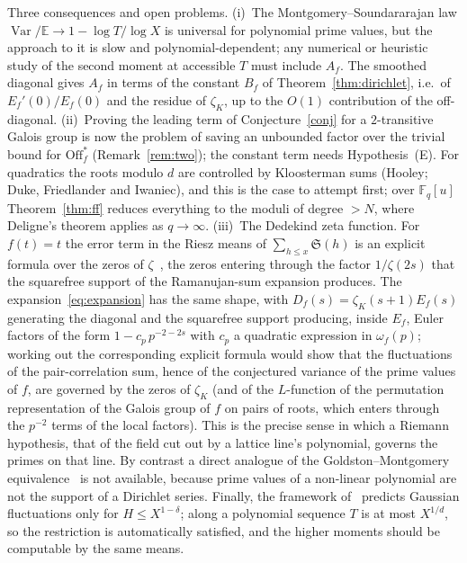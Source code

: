 \documentclass[11pt,a4paper]{article}
\theoremstyle{remark}\newtheorem{remark}[theorem]{Remark}
\newcommand{\F}{\mathbb{F}}
\newcommand{\Var}{\operatorname{Var}}
\newcommand{\E}{\mathbb{E}}
\newcommand{\Sig}{\mathfrak S}
\begin{document}
Three consequences and open problems. (i)~The Montgomery--Soundararajan law $\Var/\E\to1-\log T/\log X$
is universal for polynomial prime values, but the approach to it is slow and polynomial-dependent;
any numerical or heuristic study of the second moment at accessible $T$ must include $A_f$. The
smoothed diagonal gives $A_f$ in terms of the constant $B_f$ of Theorem~\ref{thm:dirichlet}, i.e.\ of
$E_f'(0)/E_f(0)$ and the residue of $\zeta_K$, up to the $O(1)$ contribution of the off-diagonal.
(ii)~Proving the leading term of Conjecture~\ref{conj} for a $2$-transitive Galois group is now the
problem of saving an unbounded factor over the trivial bound for $\mathrm{Off}^\ast_f$
(Remark~\ref{rem:two}); the constant term needs Hypothesis~(E). For quadratics the roots modulo $d$ are
controlled by Kloosterman sums (Hooley; Duke, Friedlander and Iwaniec), and this is the case to attempt
first; over $\F_q[u]$ Theorem~\ref{thm:ff} reduces everything to the moduli of degree $>N$, where
Deligne's theorem applies as $q\to\infty$. (iii)~The Dedekind zeta function. For $f(t)=t$ the
error term in the Riesz means of $\sum_{h\le x}\Sig(h)$ is an explicit formula over the zeros of
$\zeta$~\cite{GoldstonSuriajaya2021}, the zeros entering through the factor $1/\zeta(2s)$ that the
squarefree support of the Ramanujan-sum expansion produces. The expansion~\eqref{eq:expansion} has the
same shape, with $D_f(s)=\zeta_K(s+1)E_f(s)$ generating the diagonal and the squarefree support
producing, inside $E_f$, Euler factors of the form $1-c_p\,p^{-2-2s}$ with $c_p$ a quadratic expression
in $\omega_f(p)$; working out the corresponding explicit formula would show that the fluctuations of the pair-correlation sum, hence
of the conjectured variance of the prime values of $f$, are governed by the zeros of $\zeta_K$ (and of
the $L$-function of the permutation representation of the Galois group of $f$ on pairs of roots, which
enters through the $p^{-2}$ terms of the local factors). This is the precise sense in which a Riemann
hypothesis, that of the field cut out by a lattice line's polynomial, governs the primes on that line.
By contrast a direct analogue of the Goldston--Montgomery equivalence~\cite{GoldstonMontgomery1987} is
not available, because prime values of a non-linear polynomial are not the support of a Dirichlet
series. Finally, the framework
of~\cite{MontgomerySoundararajan2004} predicts Gaussian fluctuations only for $H\le X^{1-\delta}$; along
a polynomial sequence $T$ is at most $X^{1/d}$, so the restriction is automatically satisfied, and the
higher moments should be computable by the same means.
\end{document}
